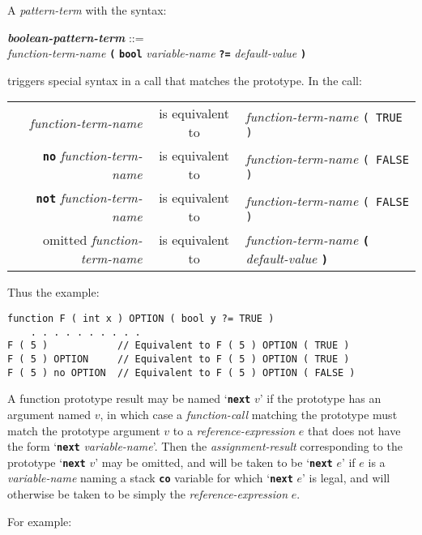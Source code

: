 \documentclass[12pt]{article}
\newcommand{\TT}[1]{{\tt \bfseries #1}}
\newcommand{\emkey}[1]{{\em \bfseries #1}}
\newenvironment{indpar}[1][0.3in]%
	{\begin{list}{}%
		     {\setlength{\itemsep}{0in}%
		      \setlength{\topsep}{0in}%
		      \setlength{\parsep}{1ex}%
		      \setlength{\labelwidth}{#1}%
		      \setlength{\leftmargin}{#1}%
		      \addtolength{\leftmargin}{\labelsep}}%
	 \item}%
	{\end{list}}
\begin{document}
A {\em pattern-term} with the syntax:
\begin{indpar}
\emkey{boolean-pattern-term}\label{BOOLEAN-PATTERN-TERM} ::= \\
\hspace*{1in} {\em function-term-name} \TT{(}
        \TT{bool} {\em variable-name}
	\TT{?=} {\em default-value} \TT{)}
\end{indpar}

triggers special syntax in a call that matches the prototype.
In the call:
\begin{center}
\begin{tabular}{rcl}
{\em function-term-name} & is equivalent to
                         & {\em function-term-name} \tt ( TRUE ) \\
\TT{no} {\em function-term-name} & is equivalent to
                         & {\em function-term-name} \tt ( FALSE ) \\
\TT{not} {\em function-term-name} & is equivalent to
                         & {\em function-term-name} \tt ( FALSE ) \\
omitted {\em function-term-name} & is equivalent to
                         & {\em function-term-name}
			   \TT{(} {\em default-value} \TT{)} \\
\end{tabular}
\end{center}
Thus the example:
\begin{indpar}\begin{verbatim}
function F ( int x ) OPTION ( bool y ?= TRUE )
    . . . . . . . . . .
F ( 5 )            // Equivalent to F ( 5 ) OPTION ( TRUE )
F ( 5 ) OPTION     // Equivalent to F ( 5 ) OPTION ( TRUE )
F ( 5 ) no OPTION  // Equivalent to F ( 5 ) OPTION ( FALSE )
\end{verbatim}\end{indpar}

A function prototype result may be named `\TT{next} $v$' if
the prototype has an argument named $v$, in which case a {\em function-call}
matching the prototype must match the prototype argument $v$ to a
{\em reference-expression} $e$ that
does not have the form `\TT{next} {\em variable-name}'.
Then the {\em assignment-result}
corresponding to the prototype `\TT{next} $v$' may be omitted, and will
be taken to be `\TT{next} $e$' if $e$ is a {\em variable-name}
naming a stack \TT{co} variable for which `\TT{next} $e$' is legal,
and will otherwise be taken to be simply the {\em reference-expression} $e$.

For example:
\end{document}
